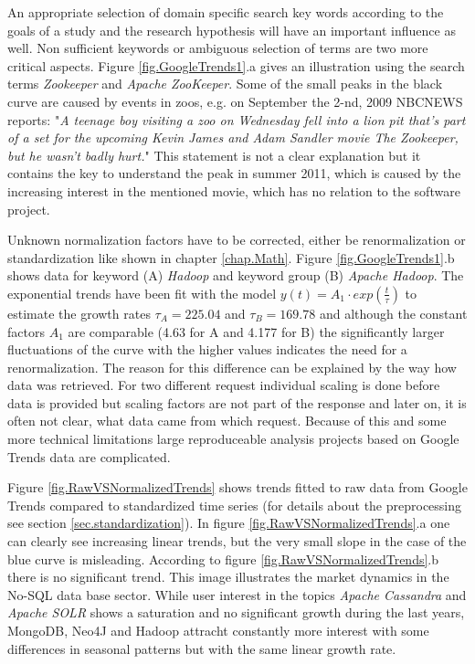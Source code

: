 \documentclass[a4paper,10pt]{scrbook}
\begin{document}
  

An appropriate selection of domain specific search key words according to the goals of a study and the research hypothesis will have 
an important influence as well. Non sufficient keywords or ambiguous selection of terms are two more critical aspects. Figure \ref{fig.GoogleTrends1}.a gives an illustration using the search terms \textit{Zookeeper} and \textit{Apache ZooKeeper}. Some of the small peaks in the black curve are caused by events in zoos, e.g. on  September the 2-nd, 2009 NBCNEWS reports: "\textit{A teenage boy visiting a zoo on Wednesday fell into a lion pit that’s part of a set for the upcoming Kevin James and Adam Sandler movie \textit{The Zookeeper}, but he wasn’t badly hurt.}" This statement is not a clear explanation but it contains the key to understand the peak in summer 2011, which is caused by the increasing interest in the mentioned movie, which has no relation to the software project.

Unknown normalization factors have to be corrected, either be renormalization or standardization like shown in chapter \ref{chap.Math}. Figure \ref{fig.GoogleTrends1}.b shows data for keyword (A) \textit{Hadoop} and keyword group (B) \textit{Apache Hadoop}. The exponential trends have been fit with the model $y(t) = A_1 \cdot exp( \frac{t}{\tau})$ to estimate the growth rates $\tau_A=225.04$ and $\tau_B=169.78$ and although the constant factors $A_1$ are comparable (4.63 for A and 4.177 for B) the significantly larger fluctuations of the curve with the higher values indicates the need for a renormalization. The reason for this difference can be explained by the way how data was retrieved. For two different request individual scaling is done before data is provided but scaling factors are not part of the response and later on, it is often not clear, what data came from which request. Because of this and some more technical limitations large reproduceable analysis projects based on Google Trends data are complicated.

\label{ext.fig.GoogleTrends3}
\label{ext.fig.RawVSNormalizedTrends}


Figure \ref{fig.RawVSNormalizedTrends} shows trends fitted to raw data from Google Trends compared to standardized time series (for details about the preprocessing see section \ref{sec.standardization}). In figure \ref{fig.RawVSNormalizedTrends}.a one can clearly see increasing linear trends, but the very small slope in the case of the blue curve is misleading. According to figure  \ref{fig.RawVSNormalizedTrends}.b there is no significant trend. This image illustrates the market dynamics in the No-SQL data base sector. While user interest in the topics \textit{Apache Cassandra} and \textit{Apache SOLR} shows a saturation and no significant growth during the last years, MongoDB, Neo4J and Hadoop attracht constantly more interest with some differences in seasonal patterns but with the same linear growth rate. 
\end{document}
